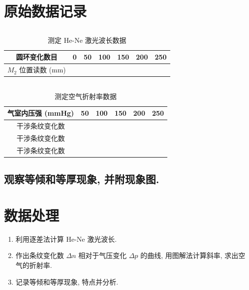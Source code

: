 \documentclass[signature=data]{physicsreport}
\begin{document}
\section{原始数据记录}
\subsection{}
\begin{table}[H]
    \caption{测定 He-Ne 激光波长数据} \label{tab:1}
    \centering
    \begin{tabularx}{\textwidth}{|c|Y|Y|Y|Y|Y|Y|} \hline
        圆环变化数目          & 0 & 50 & 100 & 150 & 200 & 250 \\\hline
        $M_2$ 位置读数 (mm) &   &    &     &     &     &     \\\hline
    \end{tabularx}
\end{table}

\subsection{}
\begin{table}[H]
    \caption{测定空气折射率数据} \label{tab:2}
    \centering
    \begin{tabularx}{\textwidth}{|c|Y|Y|Y|Y|Y|} \hline
        气室内压强 (mmHg) & 50 & 100 & 150 & 200 & 250 \\\hline
        干涉条纹变化数      &    &     &     &     &     \\\hline
        干涉条纹变化数      &    &     &     &     &     \\\hline
        干涉条纹变化数      &    &     &     &     &     \\\hline
    \end{tabularx}
\end{table}

\subsection{观察等倾和等厚现象, 并附现象图.}

\makeatletter
{}
\makeatother

\newpage
\section{数据处理}
\begin{enumerate}
    \item 利用逐差法计算 He-Ne 激光波长.
    \vspace{3cm}
    \item 作出条纹变化数 $\Delta n$ 相对于气压变化 $\Delta p$ 的曲线, 用图解法计算斜率, 求出空气的折射率.
    \vspace{3cm}
    \item 记录等倾和等厚现象, 特点并分析.
    \vspace{3cm}
\end{enumerate}
\end{document}
